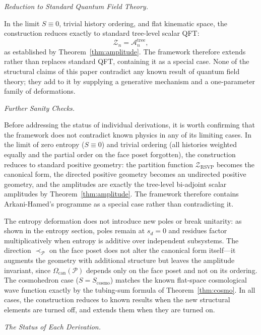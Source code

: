 \documentclass[11pt]{article}
\theoremstyle{plain}
\theoremstyle{definition}
\theoremstyle{remark}
\newcommand{\Sf}{S}
\newcommand{\CF}{\Omega_{\mathrm{can}}}
\newcommand{\ZRSVP}{\mathcal{Z}_{\mathrm{RSVP}}}
\begin{document}
\medskip\noindent\textit{Reduction to Standard Quantum Field Theory.}

In the limit $\Sf \equiv 0$, trivial history ordering, and flat kinematic space, the construction reduces exactly to standard tree-level scalar QFT:
\[
  \mathcal{Z}_n = \mathcal{A}_n^{\mathrm{tree}},
\]
as established by Theorem~\ref{thm:amplitude}. The framework therefore extends rather than replaces standard QFT, containing it as a special case. None of the structural claims of this paper contradict any known result of quantum field theory; they add to it by supplying a generative mechanism and a one-parameter family of deformations.

\medskip\noindent\textit{Further Sanity Checks.}

Before addressing the status of individual derivations, it is worth confirming that the framework does not contradict known physics in any of its limiting cases. In the limit of zero entropy ($\Sf \equiv 0$) and trivial ordering (all histories weighted equally and the partial order on the face poset forgotten), the construction reduces to standard positive geometry: the partition function $\ZRSVP$ becomes the canonical form, the directed positive geometry becomes an undirected positive geometry, and the amplitudes are exactly the tree-level bi-adjoint scalar amplitudes by Theorem~\ref{thm:amplitude}. The framework therefore contains Arkani-Hamed's programme as a special case rather than contradicting it.

The entropy deformation does not introduce new poles or break unitarity: as shown in the entropy section, poles remain at $s_d = 0$ and residues factor multiplicatively when entropy is additive over independent subsystems. The direction $\prec_{\mathcal{P}}$ on the face poset does not alter the canonical form itself---it augments the geometry with additional structure but leaves the amplitude invariant, since $\CF(\mathcal{P})$ depends only on the face poset and not on its ordering. The cosmohedron case ($\Sf = \Sf_{\mathrm{cosmo}}$) matches the known flat-space cosmological wave function exactly by the tubing-sum formula of Theorem~\ref{thm:cosmo}. In all cases, the construction reduces to known results when the new structural elements are turned off, and extends them when they are turned on.

\medskip\noindent\textit{The Status of Each Derivation.}
\end{document}
